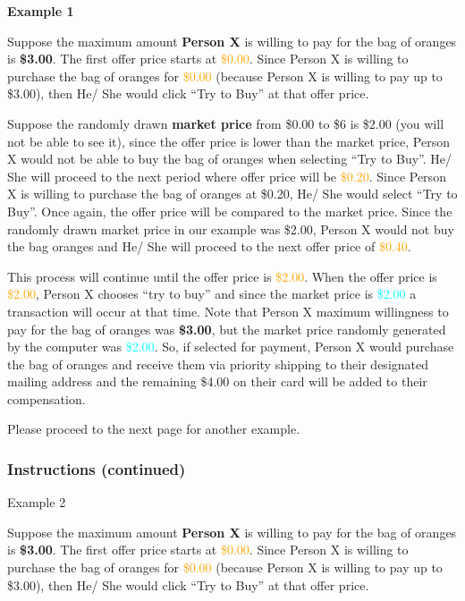 \documentclass[12pt]{article}
\begin{document}
\textbf{Example 1}

Suppose the maximum amount \textbf{Person X} is willing to pay for the bag of oranges is \textbf{\$3.00}. The first offer price starts at \textcolor{orange}{\$0.00}. Since Person X is willing to purchase the bag of oranges for \textcolor{orange}{\$0.00} (because Person X is willing to pay up to \$3.00), then He/ She would click “Try to Buy” at that offer price.

Suppose the randomly drawn \textbf{market price} from \$0.00 to \$6 is \$2.00 (you will not be able to see it), since the offer price is lower than the market price, Person X would not be able to buy the bag of oranges when selecting “Try to Buy”. He/ She will proceed to the next period where offer price will be \textcolor{orange}{\$0.20}.
Since Person X is willing to purchase the bag of oranges at \$0.20, He/ She would select “Try to Buy”. Once again, the offer price will be compared to the market price. Since the randomly drawn market price in our example was \$2.00, Person X would not buy the bag oranges and He/ She will proceed to the next offer price of \textcolor{orange}{\$0.40}.


This process will continue until the offer price is \textcolor{orange}{\$2.00}. When the offer price is \textcolor{orange}{\$2.00}, Person X chooses “try to buy” and since the market price is \textcolor{cyan}{\$2.00} a transaction will occur at that time. Note that Person X maximum willingness to pay for the bag of oranges was \textbf{\$3.00}, but the market price randomly generated by the computer was \textcolor{cyan}{\$2.00}. So, if selected for payment, Person X would purchase the bag of oranges and receive them via priority shipping to their designated mailing address and the remaining \$4.00 on their card will be added to their compensation.



Please proceed to the next page for another example.
\clearpage

\subsubsection*{\textbf{Instructions (continued)}}

Example 2

Suppose the maximum amount \textbf{Person X} is willing to pay for the bag of oranges is \textbf{\$3.00}. The first offer price starts at \textcolor{orange}{\$0.00}. Since Person X is willing to purchase the bag of oranges for \textcolor{orange}{\$0.00} (because Person X is willing to pay up to \$3.00), then He/ She would click “Try to Buy” at that offer price.
\end{document}
